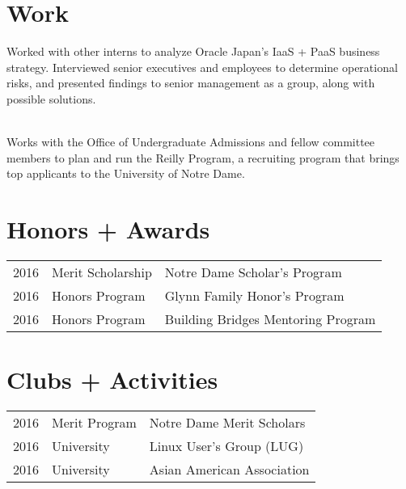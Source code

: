 \documentclass[]{yoshi}
\begin{document}
\begin{minipage}[t]{0.65\textwidth}

\section{Work}
Worked with other interns to analyze Oracle Japan's IaaS + PaaS business strategy.
Interviewed senior executives and employees to determine operational risks, and presented findings to senior management as a group, along with possible solutions.
\sectionsep

 \\
Works with the Office of Undergraduate Admissions and fellow committee members to plan and run the Reilly Program, a recruiting program that brings top applicants to the University of Notre Dame.
\sectionsep


\section{Honors + Awards}
\begin{tabular}{rll}
2016	     & Merit Scholarship  & Notre Dame Scholar's Program\\
2016	     & Honors Program  & Glynn Family Honor's Program\\
2016	     & Honors Program  & Building Bridges Mentoring Program\\
\end{tabular}
\sectionsep


\section{Clubs + Activities}

\begin{tabular}{rll}
2016   & Merit Program    & Notre Dame Merit Scholars\\
2016   &  University  & Linux User's Group (LUG)\\
2016   &  University   & Asian American Association\\
\end{tabular}
\sectionsep

\end{minipage}
\end{document}
